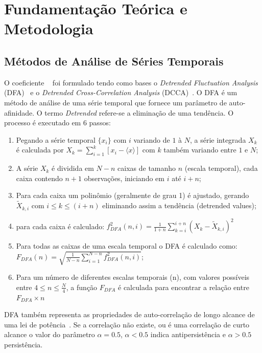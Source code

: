 \chapter{Fundamentação Teórica e Metodologia}
\label{cap:fund_teorica}

\section{Métodos de Análise de Séries Temporais}
\label{sec:dmc}

O coeficiente \pdcca~\cite{Zebende2011} foi formulado tendo como bases o \emph{Detrended Fluctuation Analysis} (DFA)~\cite{Peng_1994} e o \emph{Detrended Cross-Correlation Analysis} (DCCA)~\cite{Podobnik2008}. O DFA é um método de análise de uma série temporal que fornece um parâmetro de auto-afinidade. O termo \emph{Detrended} refere-se a eliminação de uma tendência. O processo é executado em 6 passos:

\begin{enumerate}
    \label{list:dfa}
    \item Pegando a série temporal \(\{x_{i}\}\) com  \(i\) variando de  \(1\) à \(N\), a série integrada \(X_{k}\) é calculada por \(X_{k} = \sum_{i=1}^{k}\left[x_{i} - \langle x \rangle \right] \) com \(k\) também variando entre \(1\) e \(N\);
    \item A série  \(X_{k}\) é dividida em \(N - n\) caixas de tamanho \(n\) (escala temporal), cada caixa contendo \(n + 1\) observações, iniciando em \(i\) até \(i + n\);
    \item Para cada caixa um polinômio (geralmente de grau 1) é ajustado, gerando \(\widetilde{X}_{k, i}\) com \( i \le k \le (i + n) \) eliminando assim a tendência (detrended values);
    \item  para cada caixa é calculado: \(f_{DFA}^{2}(n, i) = \frac{1}{1+n} \sum_{k=i}^{i + n}(X_{k}-\widetilde{X}_{k, i})^{2}\)
    \item Para todas as caixas de uma escala temporal o DFA é calculado como: \(F_{DFA}(n) = \sqrt{\frac{1}{N - n} \sum_{i=1}^{N-n} f_{DFA}^{2}(n, i)}\);
    \item Para um número de diferentes escalas temporais (n), com valores possíveis entre \( 4 \le n \le \frac{N}{4}\), a função \(F_{DFA}\) é calculada para encontrar a relação entre \(F_{DFA} \times n\)
  \end{enumerate}

DFA também  representa as propriedades de auto-correlação de longo alcance de uma lei de potência~\cite{Zebende2013}. Se a correlação não existe, ou é uma correlação de curto alcance o valor do parâmetro \(\alpha = 0.5\), \(\alpha < 0.5\) indica antipersistência e \(\alpha > 0.5\) persistência.

